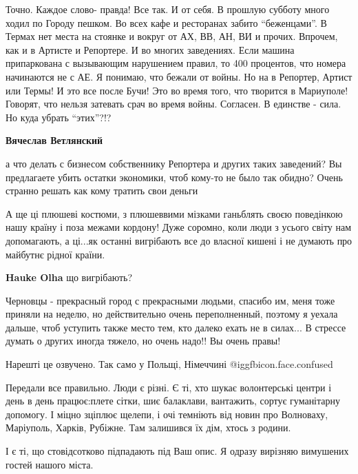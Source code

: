 \begin{itemize}
Точно. Каждое слово- правда! Все так. И от себя. В прошлую субботу много ходил
по Городу пешком. Во всех кафе и ресторанах забито \enquote{беженцами}. В Термах нет
места на стоянке и вокруг от АХ, ВВ, АН, ВИ и прочих. Впрочем, как и в Артисте
и Репортере. И во многих заведениях. Если машина припаркована с вызывающим
нарушением правил, то 400 процентов, что номера начинаются не с АЕ. Я понимаю,
что бежали от войны. Но на в Репортер, Артист или Термы! И это все после Бучи!
Это во время того, что творится в Мариуполе! Говорят, что нельзя затевать срач
во время войны. Согласен. В единстве - сила. Но куда убрать \enquote{этих}?!?

\begin{itemize} %
\textbf{Вячеслав Ветлянский} 

а что делать с бизнесом собственнику Репортера и других таких заведений? Вы
предлагаете убить остатки экономики, чтоб кому-то не было так обидно? Очень
странно решать как кому тратить свои деньги

\end{itemize} %


А ще ці плюшеві костюми, з плюшеввими мізками ганьблять своєю поведінкою нашу
країну і поза межами кордону! Дуже соромно, коли люди з усього світу нам
допомагають, а ці...як останні вигрібають все до власної кишені і не думають
про майбутнє рідної країни.

\textbf{Hauke Olha} що вигрібають?


Черновцы - прекрасный город с прекрасными людьми, спасибо им, меня тоже приняли
на неделю, но действительно очень переполненный, поэтому я уехала дальше, чтоб
уступить также место тем, кто далеко ехать не в силах... В стрессе думать о
других иногда тяжело, но очень надо!! Вы очень правы!

Нарешті це озвучено. Так само у Польщі, Німеччині  @igg{fbicon.face.confused} 


Передали все правильно. Люди є різні. Є ті, хто шукає волонтерські центри і
день в день працює:плете сітки, шиє балаклави, вантажить, сортує гуманітарну
допомогу. І міцно зціплює щелепи, і очі темніють від новин про Волноваху,
Маріуполь, Харків, Рубіжне. Там залишився їх дім, хтось з родини.

І є ті, що стовідсотково підпадають під Ваш опис. Я одразу вирізняю вимушених
гостей нашого міста.


\end{itemize}
